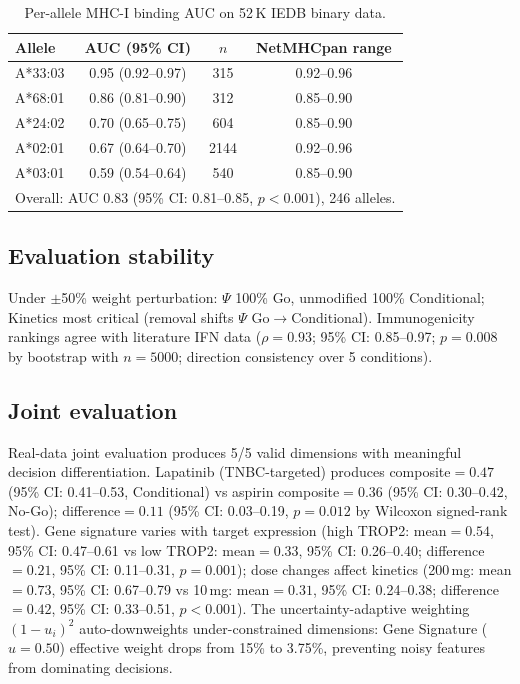\begin{table}[t]
\centering
\caption{Per-allele MHC-I binding AUC on 52\,K IEDB binary data.}
\label{tab:allele_auc}
\begin{tabular}{lccc}
\toprule
\textbf{Allele} & \textbf{AUC (95\% CI)} & \textbf{$n$} & \textbf{NetMHCpan range} \\
\midrule
A*33:03 & 0.95 (0.92--0.97) & 315 & 0.92--0.96 \\
A*68:01 & 0.86 (0.81--0.90) & 312 & 0.85--0.90 \\
A*24:02 & 0.70 (0.65--0.75) & 604 & 0.85--0.90 \\
A*02:01 & 0.67 (0.64--0.70) & 2144 & 0.92--0.96 \\
A*03:01 & 0.59 (0.54--0.64) & 540 & 0.85--0.90 \\
\bottomrule
\multicolumn{4}{l}{\small Overall: AUC 0.83 (95\% CI: 0.81--0.85, $p{<}0.001$), 246 alleles.}
\end{tabular}
\end{table}

\subsection*{Evaluation stability}
Under $\pm$50\% weight perturbation: $\Psi$ 100\% Go, unmodified 100\% Conditional; Kinetics most critical (removal shifts $\Psi$ Go$\to$Conditional). Immunogenicity rankings agree with literature IFN data ($\rho{=}0.93$; 95\% CI: 0.85--0.97; $p{=}0.008$ by bootstrap with $n{=}5000$; direction consistency over 5 conditions).

\subsection*{Joint evaluation}
Real-data joint evaluation produces 5/5 valid dimensions with meaningful decision differentiation. Lapatinib (TNBC-targeted) produces composite${=}0.47$ (95\% CI: 0.41--0.53, Conditional) vs aspirin composite${=}0.36$ (95\% CI: 0.30--0.42, No-Go); difference${=}0.11$ (95\% CI: 0.03--0.19, $p{=}0.012$ by Wilcoxon signed-rank test). Gene signature varies with target expression (high TROP2: mean${=}0.54$, 95\% CI: 0.47--0.61 vs low TROP2: mean${=}0.33$, 95\% CI: 0.26--0.40; difference${=}0.21$, 95\% CI: 0.11--0.31, $p{=}0.001$); dose changes affect kinetics (200\,mg: mean${=}0.73$, 95\% CI: 0.67--0.79 vs 10\,mg: mean${=}0.31$, 95\% CI: 0.24--0.38; difference${=}0.42$, 95\% CI: 0.33--0.51, $p{<}0.001$). The uncertainty-adaptive weighting $(1{-}u_i)^2$ auto-downweights under-constrained dimensions: Gene Signature ($u{=}0.50$) effective weight drops from 15\% to 3.75\%, preventing noisy features from dominating decisions.

